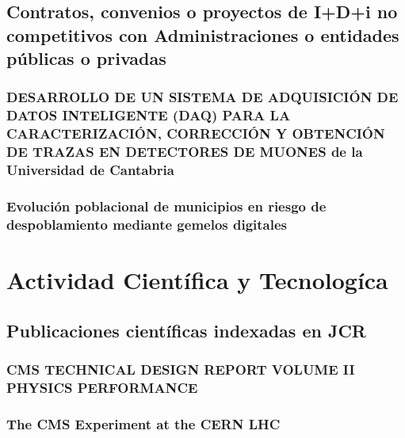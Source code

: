 \documentclass[a4paper, 11pt, twoside, openright]{report}
\begin{document}
\section{Contratos, convenios o proyectos de I+D+i no competitivos con Administraciones o entidades públicas o privadas}

\subsection{DESARROLLO DE UN SISTEMA DE ADQUISICIÓN DE DATOS INTELIGENTE (DAQ) PARA LA CARACTERIZACIÓN, CORRECCIÓN Y OBTENCIÓN DE TRAZAS EN DETECTORES DE MUONES de la Universidad de Cantabria}


\subsection{Evolución poblacional de municipios en riesgo de despoblamiento mediante gemelos digitales}




\chapter{Actividad Científica y Tecnologíca}

\section{Publicaciones científicas indexadas en JCR}

\subsection{CMS TECHNICAL DESIGN REPORT VOLUME II PHYSICS PERFORMANCE}


\subsection{The CMS Experiment at the CERN LHC}

\end{document}
